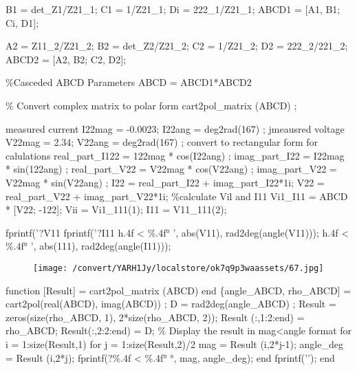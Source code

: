 \documentclass[12pt]{report}
\begin{document}
\par

\vspace{10pt}

    B1 = det\_Z1/Z21\_1;   C1 = 1/Z21\_1;   Di = 222\_1/Z21\_1;   ABCD1 = [A1, B1; Ci, D1]; 

\vspace{10pt}

    A2 = Z11\_2/Z21\_2;   B2 = det\_Z2/Z21\_2;   C2 = 1/Z21\_2;   D2 = 222\_2/221\_2;   ABCD2 = [A2, B2; C2, D2]; 

\vspace{10pt}

    \%Casceded ABCD Parameters  ABCD = ABCD1*ABCD2 

\vspace{10pt}

    \% Convert complex matrix to polar form  cart2pol\_matrix (ABCD) ; 

\vspace{10pt}

    measured current   I22mag = -0.0023;   I22ang = deg2rad(167) ;   jmeausred voltage   V22mag = 2.34;   V22ang = deg2rad(167) ;   convert to rectangular form for calulations  real\_part\_I122 = 122mag * cos(I22ang) ;  imag\_part\_I22 = I22mag * sin(122ang) ;  real\_part\_V22 = V22mag * cos(V22ang) ;  imag\_part\_V22 = V22mag * sin(V22ang) ;  I22 = real\_part\_I22 + imag\_part\_I22*1i;  V22 = real\_part\_V22 + imag\_part\_V22*1i;  \%calculate Vil and I11   Vi1\_I11 = ABCD * [V22; -122];   Vii = Vi1\_111(1);   I11 = V11\_111(2); 

\vspace{10pt}

    fprintf(’?V11  fprintf(’?I11    h.4f < \%.4f° \n’, abs(V11), rad2deg(angle(V11)));  h.4f < \%.4f° \n’, abs(111), rad2deg(angle(I11))); 

\vspace{10pt}

\begin{figure}[h]

\texttt{[image: /convert/YARH1Jy/localstore/ok7q9p3waassets/67.jpg]}

\centering

\end{figure}

\par

\vspace{10pt}

    function [Result] = cart2pol\_matrix (ABCD)    end    \{angle\_ABCD, rho\_ABCD] = cart2pol(real(ABCD), imag(ABCD)) ;  D = rad2deg(angle\_ABCD) ;  Result = zeros(size(rho\_ABCD, 1), 2*size(rho\_ABCD, 2));  Result (:,1:2:end) = rho\_ABCD;  Result(:,2:2:end) = D;  \% Display the result in mag<angle format  for i = 1:size(Result,1)  for j = 1:size(Result,2)/2  mag = Result (i,2*j-1);  angle\_deg = Result (i,2*j);  fprintf(?\%.4f < \%.4f° °, mag, angle\_deg);  end  fprintf(’\n’);  end 
\end{document}
